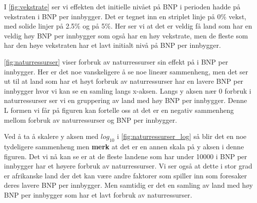 \documentclass[
  12pt,
  a4paper,
  DIV=11,
  numbers=noendperiod]{scrartcl}
\begin{document}
I \autoref{fig:vekstrate} ser vi effekten det initielle nivået på BNP i
perioden hadde på vekstraten i BNP per innbygger. Det er tegnet inn en
striplet linje på 0\% vekst, med solide linjer på 2.5\% og på 5\%. Her
ser vi at det er veldig få land som har en veldig høy BNP per innbygger
som også har en høy vekstrate, men de fleste som har den høye vekstraten
har et lavt initialt nivå på BNP per innbygger.

\autoref{fig:naturressurser} viser forbruk av naturressurser sin effekt
på i BNP per innbygger. Her er det noe vanskeligere å se noe lineær
sammenheng, men det ser ut til at land som har et høyt forbruk av
naturressurser har en lavere BNP per innbygger hvor vi kan se en samling
langs x-aksen. Langs y aksen nær 0 forbruk i naturressurser ser vi en
gruppering av land med høy BNP per innbygger. Denne L formen vi får på
figuren kan fortelle oss at det er en negativ sammenheng mellom forbruk
av naturressurser og BNP per innbygger.

Ved å ta å skalere y aksen med \(log_{10}\) i
\autoref{fig:naturressurser_log} så blir det en noe tydeligere
sammenheng men \textbf{merk} at det er en annen skala på y aksen i denne
figuren. Det vi nå kan se er at de fleste landene som har under 10000 i
BNP per innbygger har et høyere forbruk av naturressurser. Vi ser også
at dette i stor grad er afrikanske land der det kan være andre faktorer
som spiller inn som foresaker deres lavere BNP per innbygger. Men
samtidig er det en samling av land med høy BNP per innbygger som har et
lavt forbruk av naturressurser.

\clearpage
\end{document}
